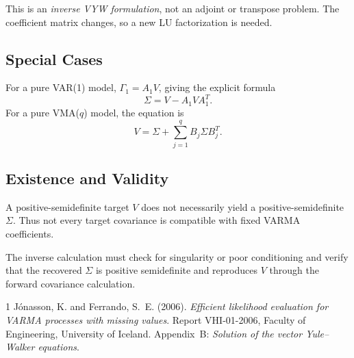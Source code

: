 \documentclass[11pt,a4paper]{article}
\begin{document}
This is an \emph{inverse VYW formulation}, not an adjoint or transpose problem.
The coefficient matrix changes, so a new LU factorization is needed.

\subsection*{Special Cases}

For a pure VAR(1) model, $\Gamma_1=A_1V$, giving the explicit formula
$$
\boxed{\Sigma=V-A_1VA_1^T.}
$$
For a pure VMA($q$) model, the equation is
$$
\boxed{V=\Sigma+\sum_{j=1}^{q}B_j\Sigma B_j^T.}
$$

\subsection*{Existence and Validity}

A positive-semidefinite target $V$ does not necessarily yield a positive-semidefinite
$\Sigma$. Thus not every target covariance is compatible with fixed VARMA
coefficients.

The inverse calculation must check for singularity or poor conditioning and verify
that the recovered $\Sigma$ is positive semidefinite and reproduces $V$ through
the forward covariance calculation.

\begin{thebibliography}{1}
J\'onasson, K. and Ferrando, S.~E. (2006).
\emph{Efficient likelihood evaluation for VARMA processes with missing values}.
Report VHI-01-2006, Faculty of Engineering, University of Iceland.
Appendix~B: \emph{Solution of the vector Yule--Walker equations}.
\end{thebibliography}
\end{document}

